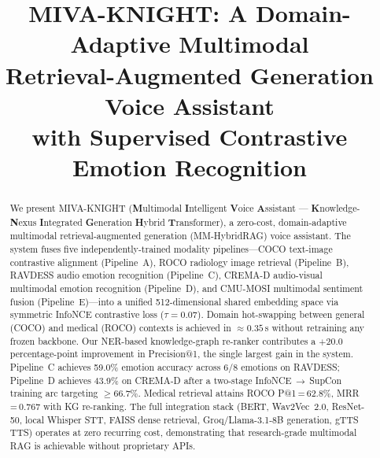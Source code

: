 \documentclass[10pt,conference]{IEEEtran}
\theoremstyle{ieeethm}
\theoremstyle{ieeedef}
\theoremstyle{ieeeremark}
\begin{document}
\title{MIVA-KNIGHT: A Domain-Adaptive Multimodal\\
Retrieval-Augmented Generation Voice Assistant\\
with Supervised Contrastive Emotion Recognition}

\author{%
\and
{}
}

\maketitle

\begin{abstract}
We present \textsc{MIVA-KNIGHT} (\textbf{M}ultimodal \textbf{I}ntelligent \textbf{V}oice \textbf{A}ssistant — \textbf{K}nowledge-\textbf{N}exus \textbf{I}ntegrated \textbf{G}eneration \textbf{H}ybrid \textbf{T}ransformer), a zero-cost, domain-adaptive multimodal retrieval-augmented generation (MM-HybridRAG) voice assistant. The system fuses five independently-trained modality pipelines—COCO text-image contrastive alignment (Pipeline~A), ROCO radiology image retrieval (Pipeline~B), RAVDESS audio emotion recognition (Pipeline~C), CREMA-D audio-visual multimodal emotion recognition (Pipeline~D), and CMU-MOSI multimodal sentiment fusion (Pipeline~E)—into a unified 512-dimensional shared embedding space via symmetric InfoNCE contrastive loss ($\tau{=}0.07$). Domain hot-swapping between general (COCO) and medical (ROCO) contexts is achieved in ${\approx}0.35$\,s without retraining any frozen backbone. Our NER-based knowledge-graph re-ranker contributes a $+20.0$ percentage-point improvement in Precision@1, the single largest gain in the system. Pipeline~C achieves 59.0\% emotion accuracy across 6/8 emotions on RAVDESS; Pipeline~D achieves 43.9\% on CREMA-D after a two-stage InfoNCE\,$\rightarrow$\,SupCon training arc targeting ${\geq}66.7\%$. Medical retrieval attains ROCO P@1\,=\,62.8\%, MRR\,=\,0.767 with KG re-ranking. The full integration stack (BERT, Wav2Vec~2.0, ResNet-50, local Whisper STT, FAISS dense retrieval, Groq/Llama-3.1-8B generation, gTTS TTS) operates at zero recurring cost, demonstrating that research-grade multimodal RAG is achievable without proprietary APIs.
\end{abstract}
\end{document}
